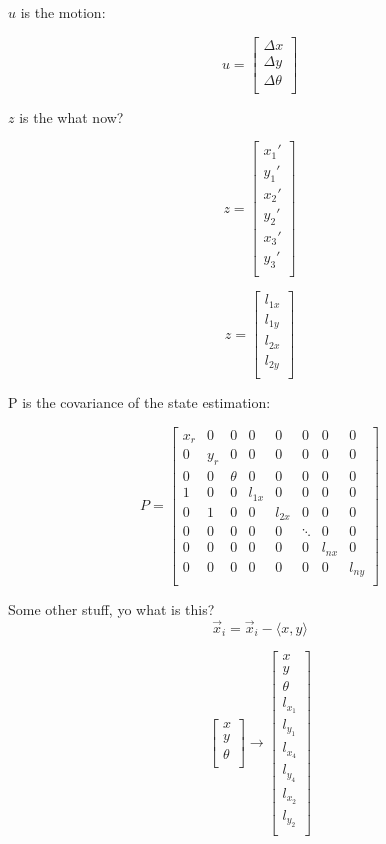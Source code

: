 \documentclass[prodmode,acmtecs]{acmsmall} %
\begin{document}
$u$ is the motion:

$$
u = 
\begin{bmatrix}
    \Delta x \\
    \Delta y \\
    \Delta \theta \\
\end{bmatrix}
$$

$z$ is the what now?

$$
z = 
\begin{bmatrix}
    x_1' \\
    y_1' \\
    x_2' \\
    y_2' \\
    x_3' \\
    y_3' \\
\end{bmatrix}
$$

$$
z = 
\begin{bmatrix}
    l_{1x} \\
    l_{1y} \\
    l_{2x} \\
    l_{2y} \\
\end{bmatrix}
$$

P is the covariance of the state estimation:

$$
P =
\begin{bmatrix}
    x_r & 0 & 0 & 0 & 0 & 0 & 0 & 0 \\
    0 & y_r & 0 & 0 & 0 & 0 & 0 & 0 \\
    0 & 0 & \theta & 0 & 0 & 0 & 0 & 0 \\
    1 & 0 & 0 & l_{1x} & 0 & 0 & 0 & 0 \\
    0 & 1 & 0 & 0 & l_{2x} & 0 & 0 & 0 \\
    0 & 0 & 0 & 0 & 0 & \ddots & 0 & 0 \\
    0 & 0 & 0 & 0 & 0 & 0 & l_{nx} & 0 \\
    0 & 0 & 0 & 0 & 0 & 0 & 0 & l_{ny} \\
\end{bmatrix}
$$



Some other stuff, yo what is this?
$$
\vec{x}_i = \vec{x}_i - \langle x, y \rangle
$$



$$
\begin{bmatrix}
    x \\
    y \\
    \theta \\
\end{bmatrix}
\rightarrow
\begin{bmatrix}
    x \\
    y \\
    \theta \\
    l_{x_1} \\
    l_{y_1} \\
    l_{x_4} \\
    l_{y_4} \\
    l_{x_2} \\
    l_{y_2} \\
\end{bmatrix}
$$
\end{document}
